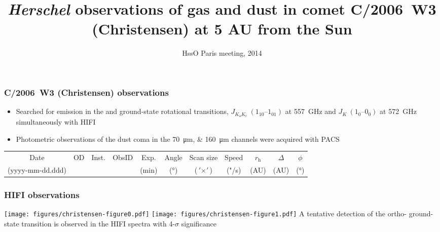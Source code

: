 \documentclass{beamer}
\newcommand{\herschel}{{\it Herschel}}
\newcommand{\christensen}{C/2006~W3 (Christensen)}
\newcommand{\rh}{r_\mathrm{h}}
\newcommand{\trans}{$J_{K_\mathrm{a} K_\mathrm{c}}\ (1_{10}\text{--}1_{01})$}
\newcommand{\nh}{$J_K\ (1_{0}\text{--}0_{0})$}
\newcommand\Fontvi{\fontsize{6}{7.2}\selectfont}
\begin{document}
\title{\herschel{} observations of gas and dust in comet
\christensen{} at  5 AU from the Sun}
\date{HssO Paris meeting, 2014}

\frame{\titlepage}

\begin{frame}
\frametitle{\christensen{} observations}
  \begin{itemize}
  \item Searched for emission in the  and 
  ground-state rotational transitions, \trans{} at
  \SI{557}{\giga\hertz} and \nh{} at \SI{572}{\giga\hertz}
  simultaneously with HIFI
  \item Photometric observations of the dust coma in the
  \SIlist{70;160}{\um} channels were acquired with PACS
  \end{itemize}
  \Fontvi
  \begin{table}
    \centering
    \begin{tabular}{c S[table-format = 3] c
		    S[table-format = 10,
		    table-space-text-post = \textsuperscript{\emph{h}}]
		    S[table-format = 2.1]
		    S[table-format = 3]
		    c c c c S
		    }
      \toprule
      Date &
      {OD} &
      Inst. & {ObsID} & {Exp.} &
      {Angle} &
      {Scan size} &
      {Speed} &
      $\rh$ &
      $\Delta$ &
      {$\phi$}\\
      (yyyy-mm-dd.ddd) & & & & {(\si{\minute})} &
      {(\si{\degree})} & {($\si{\arcmin} \times \si{\arcmin}$)} &
      {("/s)} &
      (AU) & (AU) & {(\si{\degree})}\\
      \midrule
      
      \bottomrule
    \end{tabular}
  \end{table}
\end{frame}

\begin{frame}
\frametitle{HIFI observations}
\texttt{[image: figures/christensen-figure0.pdf]}
\texttt{[image: figures/christensen-figure1.pdf]}
A tentative detection of the ortho- ground-state transition is
observed in the HIFI spectra with 4-$\sigma$ significance
\end{frame}
\end{document}
